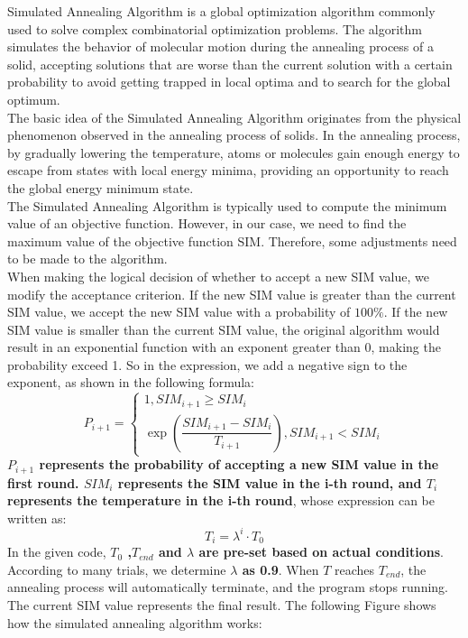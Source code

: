 \indent\indent Simulated Annealing Algorithm is a global optimization algorithm commonly used to solve complex combinatorial optimization problems. The algorithm simulates the behavior of molecular motion during the annealing process of a solid, accepting solutions that are worse than the current solution with a certain probability to avoid getting trapped in local optima and to search for the global optimum.\\
\indent The basic idea of the Simulated Annealing Algorithm originates from the physical phenomenon observed in the annealing process of solids. In the annealing process, by gradually lowering the temperature, atoms or molecules gain enough energy to escape from states with local energy minima, providing an opportunity to reach the global energy minimum state.\\
\indent The Simulated Annealing Algorithm is typically used to compute the minimum value of an objective function. However, in our case, we need to find the maximum value of the objective function SIM. Therefore, some adjustments need to be made to the algorithm.\\
\indent When making the logical decision of whether to accept a new SIM value, we modify the acceptance criterion. If the new SIM value is greater than the current SIM value, we accept the new SIM value with a probability of $100\%$. If the new SIM value is smaller than the current SIM value, the original algorithm would result in an exponential function with an exponent greater than 0, making the probability exceed 1. So in the expression, we add a negative sign to the exponent, as shown in the following formula:
\[%
    P_{i+1}=
    \left\{
        \begin{array}{ll}
            1, SIM_{i+1} \geq SIM_i \\
            \exp\left(\dfrac{{SIM_{i+1} - SIM_i}}{{T_{i+1}}}\right), SIM_{i+1} < SIM_i
        \end{array}
        \right.
\]
\indent \textbf{$P_{i+1}$ represents the probability of accepting a new SIM value in the first round. $SIM_i$ represents the SIM value in the i-th round, and $T_i$ represents the temperature in the i-th round}, whose expression can be written as:
\begin{equation*}
    T_i=\lambda^i \cdot T_0
\end{equation*}
\indent In the given code, \textbf{$T_0$ ,$T_{end}$ and $\lambda$ are pre-set based on actual conditions}. According to many trials, we determine \textbf{$\lambda$ as 0.9}. When $T$ reaches $T_{end}$, the annealing process will automatically terminate, and the program stops running. The current SIM value represents the final result. The following Figure shows how the simulated annealing algorithm works:\\
